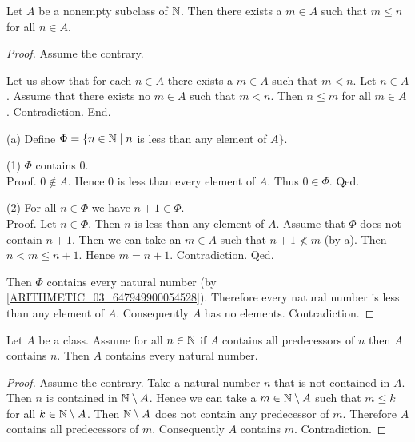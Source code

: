 \documentclass[10pt]{article}
\begin{document}
  \begin{forthel}
    \begin{proposition}
      Let $A$ be a nonempty subclass of $\mathbb{N}$.
      Then there exists a $m \in A$ such that $m \leq n$ for all $n \in A$.
    \end{proposition}
    \begin{proof}
      Assume the contrary.

      Let us show that for each $n \in A$ there exists a $m \in A$ such that $m < n$.
        Let $n \in A$.
        Assume that there exists no $m \in A$ such that $m < n$.
        Then $n \leq m$ for all $m \in A$.
        Contradiction.
      End.

      (a) Define $\Phi = \{ n \in \mathbb{N} \mid n$ is less than any element of $A \}$.

      (1) $\Phi$ contains $0$. \\
      Proof.
        $0 \notin A$.
        Hence $0$ is less than every element of $A$.
        Thus $0 \in \Phi$.
      Qed.

      (2) For all $n \in \Phi$ we have $n + 1 \in \Phi$. \\
      Proof.
        Let $n \in \Phi$.
        Then $n$ is less than any element of $A$.
        Assume that $\Phi$ does not contain $n + 1$.
        Then we can take an $m \in A$ such that $n + 1 \nless m$ (by a).
        Then $n < m \leq n + 1$.
        Hence $m = n + 1$.
        Contradiction.
      Qed.

      Then $\Phi$ contains every natural number (by \cref{ARITHMETIC_03_647949900054528}).
      Therefore every natural number is less than any element of $A$.
      Consequently $A$ has no elements.
      Contradiction.
    \end{proof}
  \end{forthel}

  \begin{forthel}
    \begin{theorem}
      Let $A$ be a class.
      Assume for all $n \in \mathbb{N}$ if $A$ contains all predecessors of $n$ then $A$ contains $n$.
      Then $A$ contains every natural number.
    \end{theorem}
    \begin{proof}
      Assume the contrary.
      Take a natural number $n$ that is not contained in $A$.
      Then $n$ is contained in $\mathbb{N} \setminus A$.
      Hence we can take a $m \in \mathbb{N} \setminus A$ such that $m \leq k$ for all $k \in \mathbb{N} \setminus A$.
      Then $\mathbb{N} \setminus A$ does not contain any predecessor of $m$.
      Therefore $A$ contains all predecessors of $m$.
      Consequently $A$ contains $m$.
      Contradiction.
    \end{proof}
  \end{forthel}
\end{document}

